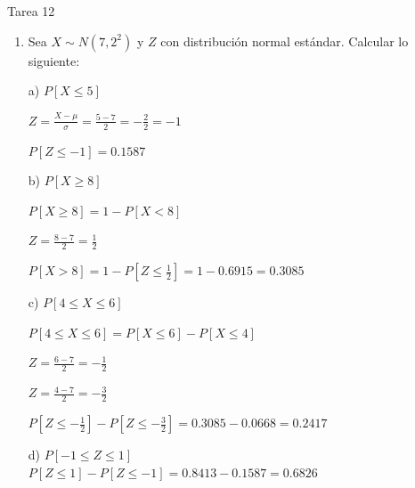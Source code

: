 \documentclass[a4paper, 12pt]{article}
\newcommand{\Aspace}{0.2cm}
\begin{document}
    \newpage
    \vspace{0.3cm}

    \begin{center}
        { \LARGE Tarea 12}
    \end{center}

    \begin{enumerate}
        \item Sea $X \sim N(7, 2^{2})$ y $Z$ con distribución normal estándar. Calcular lo siguiente:
            \vspace{\Aspace} \par
            a) $P[X \leq 5]$
            \vspace{\Aspace}
            \\ { \color{azul} 
                \(
                    Z = \frac{X - \mu}{\sigma}
                    = \frac{5 - 7}{2}
                    = -\frac{2}{2}
                    = -1
                \) \par
                \( P[Z \leq -1] = 0{.}1587 \)
            }

            \vspace{\Aspace} \par
            b) $P[X \geq 8]$
            \vspace{\Aspace}
            \\ { \color{azul} 
                \( P[X \geq 8] = 1 - P[X < 8] \) \par
                \( Z = \frac{8 - 7}{2} = \frac{1}{2} \) \par
                \( P[X > 8] = 1 - P\left[Z \leq \frac{1}{2}\right] = 1 - 0{.}6915 = 0{.}3085 \)
            }

            \vspace{\Aspace} \par
            c) $P[4 \leq X \leq 6]$
            \vspace{\Aspace}
            \\ { \color{azul} 
                \( P[4 \leq X \leq 6] = P[X \leq 6] - P[X \leq 4] \) \par
                \( Z = \frac{6 - 7}{2} = -\frac{1}{2}\) \par
                \( Z = \frac{4 - 7}{2} = -\frac{3}{2}\) \par
                \( P[Z \leq -\frac{1}{2}] - P[Z \leq -\frac{3}{2}] = 0{.}3085 - 0{.}0668 = 0{.}2417\)
            }

            \vspace{\Aspace} \par
            d) $P[-1 \leq Z \leq 1]$
            \vspace{\Aspace}
            \\ { \color{azul} $P[Z \leq 1] - P[Z \leq -1] = 0{.}8413 - 0{.}1587 = 0{.}6826$ }


\end{enumerate}
\end{document}
